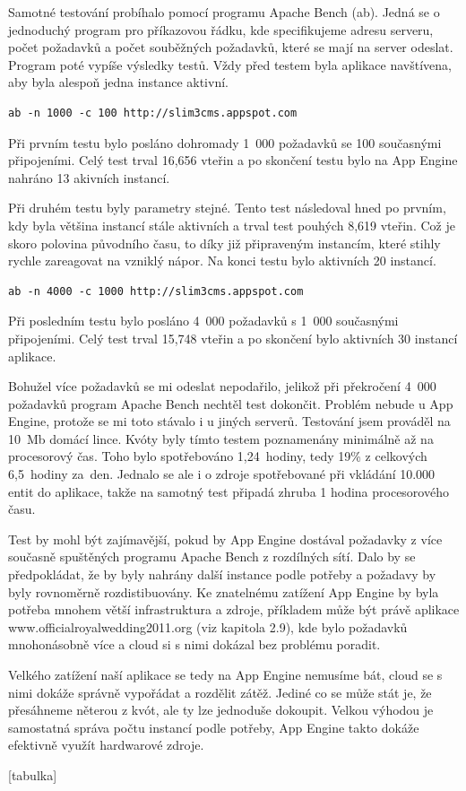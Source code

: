 Samotné testování probíhalo pomocí programu Apache Bench (ab). Jedná se o jednoduchý program pro příkazovou řádku, kde specifikujeme adresu serveru, počet požadavků a počet souběžných požadavků, které se mají na server odeslat. Program poté vypíše výsledky testů. Vždy před testem byla aplikace navštívena, aby byla alespoň jedna instance aktivní.

\lstset{language=bash}
\lstset{numbers=none}
\lstset{frame=none}
\begin{lstlisting}[caption={Testování 1000 požadavků se 100 souběžnými spojeními},label=lst:testOne,belowcaptionskip=0.4cm]
ab -n 1000 -c 100 http://slim3cms.appspot.com
\end{lstlisting}

Při prvním testu bylo posláno dohromady 1~000 požadavků se 100 současnými připojeními. Celý test trval 16,656 vteřin a po skončení testu bylo na App Engine nahráno 13 akivních instancí.

Při druhém testu byly parametry stejné. Tento test následoval hned po prvním, kdy byla většina instancí stále aktivních a trval test pouhých 8,619 vteřin. Což je skoro polovina původního času, to díky již připraveným instancím, které stihly rychle zareagovat na vzniklý nápor. Na konci testu bylo aktivních 20 instancí.

\begin{lstlisting}[caption={Testování 4000 požadavků s 1000 souběžnými spojeními},label=lst:testThree,belowcaptionskip=0.4cm]
ab -n 4000 -c 1000 http://slim3cms.appspot.com
\end{lstlisting}

Při posledním testu bylo posláno 4~000 požadavků s 1~000 současnými připojeními. Celý test trval 15,748 vteřin a po skončení bylo aktivních 30 instancí aplikace.

Bohužel více požadavků se mi odeslat nepodařilo, jelikož při překročení 4~000 požadavků program Apache Bench nechtěl test dokončit. Problém nebude u App Engine, protože se mi toto stávalo i u jiných serverů. Testování jsem prováděl na 10~Mb domácí lince. Kvóty byly tímto testem poznamenány minimálně až na procesorový čas. Toho bylo spotřebováno 1,24~hodiny, tedy 19\% z celkových 6,5~hodiny za~den. Jednalo se ale i o zdroje spotřebované při vkládání 10.000 entit do aplikace, takže na samotný test připadá zhruba 1 hodina procesorového času.

Test by mohl být zajímavější, pokud by App Engine dostával požadavky z více současně spuštěných programu Apache Bench z rozdílných sítí. Dalo by se předpokládat, že by byly nahrány další instance podle potřeby a požadavy by byly rovnoměrně rozdistibuovány. Ke znatelnému zatížení App Engine by byla potřeba mnohem větší infrastruktura a zdroje, příkladem může být právě aplikace www.officialroyalwedding2011.org (viz kapitola 2.9), kde bylo požadavků mnohonásobně více a cloud si s nimi dokázal bez problému poradit.

Velkého zatížení naší aplikace se tedy na App Engine nemusíme bát, cloud se s nimi dokáže správně vypořádat a rozdělit zátěž. Jediné co se může stát je, že přesáhneme něterou z kvót, ale ty lze jednoduše dokoupit. Velkou výhodou je samostatná správa počtu instancí podle potřeby, App Engine takto dokáže efektivně využít hardwarové zdroje.

[tabulka]
